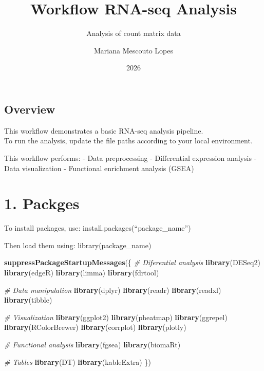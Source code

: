 \documentclass[
]{article}
\title{Workflow RNA-seq Analysis}
\subtitle{Analysis of count matrix data}
\author{Mariana Mescouto Lopes}
\date{2026}
\newenvironment{Shaded}{\begin{snugshade}}{\end{snugshade}}
\newcommand{\CommentTok}[1]{\textcolor[rgb]{0.56,0.35,0.01}{\textit{#1}}}
\newcommand{\FunctionTok}[1]{\textcolor[rgb]{0.13,0.29,0.53}{\textbf{#1}}}
\newcommand{\NormalTok}[1]{#1}
\begin{document}
\maketitle

{
\setcounter{tocdepth}{2}
\tableofcontents
}
\subsection{Overview}\label{overview}

This workflow demonstrates a basic RNA-seq analysis pipeline.\\
To run the analysis, update the file paths according to your local
environment.

This workflow performs: - Data preprocessing - Differential expression
analysis - Data visualization - Functional enrichment analysis (GSEA)

\section{1. Packges}\label{packges}

To install packages, use: install.packages(``package\_name'')

Then load them using: library(package\_name)

\begin{Shaded}
\begin{Highlighting}[]
\FunctionTok{suppressPackageStartupMessages}\NormalTok{(\{}
  \CommentTok{\# Diferential analysis}
  \FunctionTok{library}\NormalTok{(DESeq2)}
  \FunctionTok{library}\NormalTok{(edgeR) }
  \FunctionTok{library}\NormalTok{(limma)}
  \FunctionTok{library}\NormalTok{(fdrtool)}
  
  \CommentTok{\# Data manipulation}
  \FunctionTok{library}\NormalTok{(dplyr)}
  \FunctionTok{library}\NormalTok{(readr)}
  \FunctionTok{library}\NormalTok{(readxl)}
  \FunctionTok{library}\NormalTok{(tibble)}
  
  \CommentTok{\# Visualization}
  \FunctionTok{library}\NormalTok{(ggplot2)}
  \FunctionTok{library}\NormalTok{(pheatmap)}
  \FunctionTok{library}\NormalTok{(ggrepel)}
  \FunctionTok{library}\NormalTok{(RColorBrewer)}
  \FunctionTok{library}\NormalTok{(corrplot)}
  \FunctionTok{library}\NormalTok{(plotly)}
  
  \CommentTok{\# Functional analysis}
  \FunctionTok{library}\NormalTok{(fgsea)}
  \FunctionTok{library}\NormalTok{(biomaRt)}
  
  \CommentTok{\# Tables}
  \FunctionTok{library}\NormalTok{(DT)}
  \FunctionTok{library}\NormalTok{(kableExtra)}
\NormalTok{\})}
\end{Highlighting}
\end{Shaded}
\end{document}
